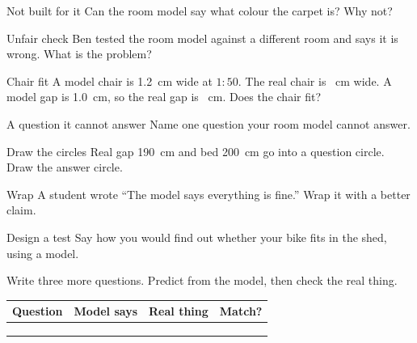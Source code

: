 \begin{puzzle}{Not built for it}
Can the room model say what colour the carpet is? \wline[2cm] Why not? \wline[4cm]
\end{puzzle}

\begin{puzzle}{Unfair check}
Ben tested the room model against a different room and says it is wrong. What is the problem? \wline[6cm]
\end{puzzle}

\clearpage

\begin{puzzle}{Chair fit}
A model chair is 1.2~cm wide at $1:50$. The real chair is \wline[1.6cm]~cm wide. A model gap is 1.0~cm, so the real gap is \wline[1.6cm]~cm. Does the chair fit? \wline[2cm]
\end{puzzle}

\begin{puzzle}{A question it cannot answer}
Name one question your room model cannot answer. \wline[6cm]
\end{puzzle}

\begin{puzzle}{Draw the circles}
Real gap 190~cm and bed 200~cm go into a question circle. Draw the answer circle.
\begin{center}\end{center}
\end{puzzle}

\begin{puzzle}{Wrap}
A student wrote ``The model says everything is fine.'' Wrap it with a better claim. \wline[6cm]
\end{puzzle}

\begin{puzzle}{Design a test}
Say how you would find out whether your bike fits in the shed, using a model. \wline[6cm]
\end{puzzle}
\clearpage

\thispagestyle{fancy}
Write three more questions. Predict from the model, then check the real thing.\par\medskip
\renewcommand{\arraystretch}{3.0}
\begin{tabularx}{\linewidth}{|>{\sffamily\small\bfseries}p{3.2cm}|X|X|X|}
\hline
Question & Model says & Real thing & Match? \\ \hline
 & & & \\ \hline
 & & & \\ \hline
 & & & \\ \hline
\end{tabularx}

